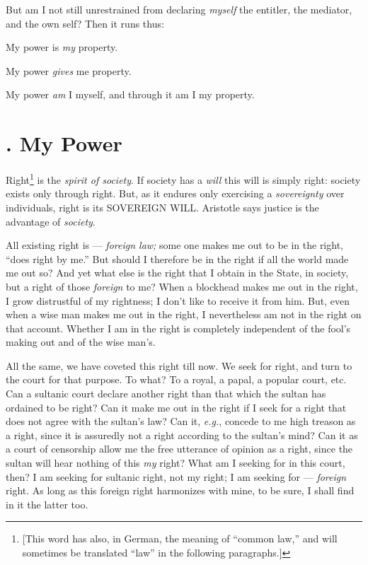 But am I not still unrestrained from declaring \textit{myself} the entitler, 
the mediator, and the own self? Then it runs thus:

My power is \textit{my} property.

My power \textit{gives} me property.

My power \textit{am} I myself, and through it am I my property.

\section[1. My Power]{. My Power}

Right\footnote{[This word has also, in German, the meaning of ``common 
law,'' and will sometimes be translated ``law'' in the following 
paragraphs.]} is the \textit{spirit of society}. If society has a 
\textit{will} this will is simply right: society exists only through right. 
But, as it endures only exercising a \textit{sovereignty} over individuals, 
right is its SOVEREIGN WILL. Aristotle says justice is the advantage of 
\textit{society}.

All existing right is --- \textit{foreign law;} some one makes me out to be in 
the right, ``does right by me.'' But should I therefore be in the right if 
all the world made me out so? And yet what else is the right that I obtain in 
the State, in society, but a right of those \textit{foreign} to me? When a 
blockhead makes me out in the right, I grow distrustful of my rightness; I 
don't like to receive it from him. But, even when a wise man makes me out in 
the right, I nevertheless am not in the right on that account. Whether I am in 
the right is completely independent of the fool's making out and of the wise 
man's.

All the same, we have coveted this right till now. We seek for right, and turn 
to the court for that purpose. To what? To a royal, a papal, a popular court, 
etc. Can a sultanic court declare another right than that which the sultan has 
ordained to be right? Can it make me out in the right if I seek for a right 
that does not agree with the sultan's law? Can it, \textit{e.g.}, concede to 
me high treason as a right, since it is assuredly not a right according to the 
sultan's mind? Can it as a court of censorship allow me the free utterance of 
opinion as a right, since the sultan will hear nothing of this \textit{my} 
right? What am I seeking for in this court, then? I am seeking for sultanic 
right, not my right; I am seeking for --- \textit{foreign} right. As long as 
this foreign right harmonizes with mine, to be sure, I shall find in it the 
latter too.

